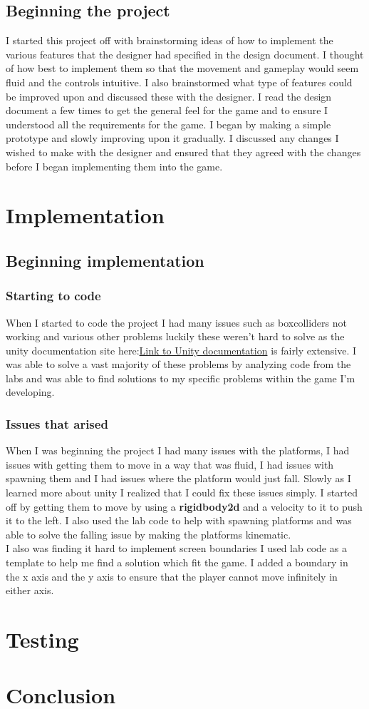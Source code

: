 \documentclass{report}
\begin{document}
\section{Beginning the project}
I started this project off with brainstorming ideas of how to implement the various features that the designer had specified in the design document. I thought of how best to implement them so that the movement and gameplay would seem fluid and the controls intuitive. I also brainstormed what type of features could be improved upon and discussed these with the designer. I read the design document a few times to get the general feel for the game and to ensure I understood all the requirements for the game.  I began by making a simple prototype and slowly improving upon it gradually.  I discussed any changes I wished to make with the designer and ensured that they agreed with the changes before I began implementing them into the game.
\chapter{Implementation}
\section{Beginning implementation}
\subsection{Starting to code}
When I started to code the project I had many issues such as boxcolliders not working and various other problems luckily these weren't  hard to solve as the unity documentation site here:\href{https://docs.unity3d.com/Manual/index.html}{Link to Unity documentation} is fairly extensive.  I was able to solve a vast majority of these problems by analyzing code from the labs and was able to find solutions to my specific problems within the game I'm developing. 
\subsection{Issues that arised}
When I was beginning the project I had many issues with the platforms, I had issues with getting them to move in a way that was fluid, I had issues with spawning them and I had issues where the platform would just fall.  Slowly as I learned more about unity I realized that I could fix these issues simply. I started off by getting them to move by using a \textbf{rigidbody2d} and a velocity to it to push it to the left. I also used the lab code to help with spawning platforms and was able to solve the falling issue by making the platforms kinematic.
\\
I also was finding it hard to implement screen boundaries I used lab code as a template to help me find a solution which fit the game.  I added a boundary in the x axis and the y axis to ensure that the player cannot move infinitely in either axis.
\chapter{Testing}
\chapter{Conclusion}
\end{document}
